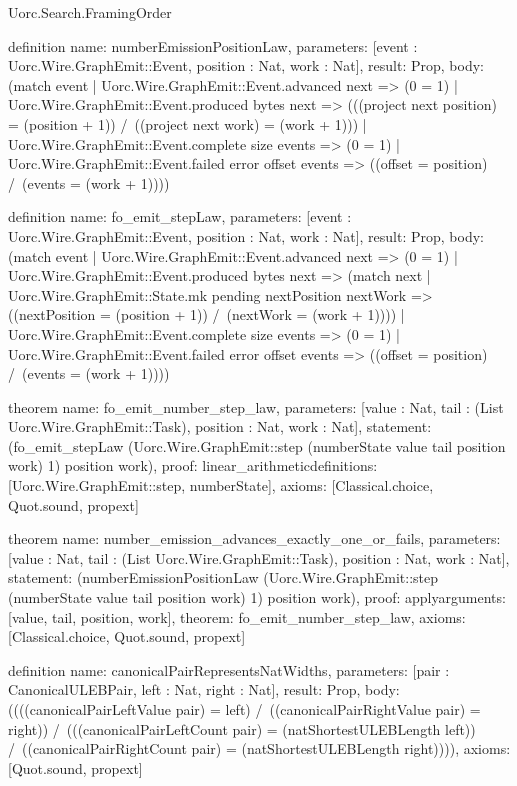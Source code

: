 \begin{lexlean}{Uorc.Search.FramingOrder}
\begin{semanticmodule}
definition{
  name: numberEmissionPositionLaw,
  parameters: [event : Uorc.Wire.GraphEmit::Event, position : Nat, work : Nat],
  result: Prop,
  body: (match event
    | Uorc.Wire.GraphEmit::Event.advanced next => (0 = 1)
    | Uorc.Wire.GraphEmit::Event.produced bytes next => (((project next position) = (position + 1)) /\ ((project next work) = (work + 1)))
    | Uorc.Wire.GraphEmit::Event.complete size events => (0 = 1)
    | Uorc.Wire.GraphEmit::Event.failed error offset events => ((offset = position) /\ (events = (work + 1))))
}

definition{
  name: fo_emit_stepLaw,
  parameters: [event : Uorc.Wire.GraphEmit::Event, position : Nat, work : Nat],
  result: Prop,
  body: (match event
    | Uorc.Wire.GraphEmit::Event.advanced next => (0 = 1)
    | Uorc.Wire.GraphEmit::Event.produced bytes next => (match next
      | Uorc.Wire.GraphEmit::State.mk pending nextPosition nextWork => ((nextPosition = (position + 1)) /\ (nextWork = (work + 1))))
    | Uorc.Wire.GraphEmit::Event.complete size events => (0 = 1)
    | Uorc.Wire.GraphEmit::Event.failed error offset events => ((offset = position) /\ (events = (work + 1))))
}

theorem{
  name: fo_emit_number_step_law,
  parameters: [value : Nat, tail : (List Uorc.Wire.GraphEmit::Task), position : Nat, work : Nat],
  statement: (fo_emit_stepLaw (Uorc.Wire.GraphEmit::step (numberState value tail position work) 1) position work),
  proof: linear_arithmetic{definitions: [Uorc.Wire.GraphEmit::step, numberState]},
  axioms: [Classical.choice, Quot.sound, propext]
}

theorem{
  name: number_emission_advances_exactly_one_or_fails,
  parameters: [value : Nat, tail : (List Uorc.Wire.GraphEmit::Task), position : Nat, work : Nat],
  statement: (numberEmissionPositionLaw (Uorc.Wire.GraphEmit::step (numberState value tail position work) 1) position work),
  proof: apply{arguments: [value, tail, position, work], theorem: fo_emit_number_step_law},
  axioms: [Classical.choice, Quot.sound, propext]
}

definition{
  name: canonicalPairRepresentsNatWidths,
  parameters: [pair : CanonicalULEBPair, left : Nat, right : Nat],
  result: Prop,
  body: ((((canonicalPairLeftValue pair) = left) /\ ((canonicalPairRightValue pair) = right)) /\ (((canonicalPairLeftCount pair) = (natShortestULEBLength left)) /\ ((canonicalPairRightCount pair) = (natShortestULEBLength right)))),
  axioms: [Quot.sound, propext]
}


\end{semanticmodule}
\end{lexlean}
